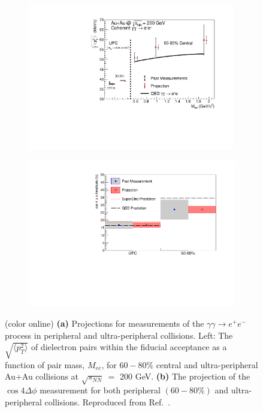 \documentclass[12pt,epjc3]{svjour3}\sloppy
\begin{document}
\begin{figure}
    \centering
    \begin{subfigure}{.50\textwidth}
      \centering
      \includegraphics[width=0.99\textwidth]{fig/bur_fig57_left.pdf}
      \caption{}
    \end{subfigure}%
    \begin{subfigure}{.50\textwidth}
      \centering
      \includegraphics[width=.99\linewidth]{fig/bur_fig57_right.pdf}
      \caption{}
    \end{subfigure}
    \caption{(color online) \textbf{(a)} Projections for measurements of the $\gamma\gamma\rightarrow e^+e^-$ process in peripheral and ultra-peripheral collisions. Left: The $\sqrt{\langle p_T^2 \rangle }$ of dielectron pairs within the fiducial acceptance as a function of pair mass, $M_{ee}$, for $60-80\%$ central and ultra-peripheral Au+Au collisions at $\sqrt{s_{NN}}\ =$ 200 GeV. \textbf{(b)} The projection of the $\cos{4\Delta\phi}$ measurement for both peripheral $(60-80\%)$ and ultra-peripheral collisions. Reproduced from Ref.~\cite{SN0755STARBeam}. }
    \label{fig:future2}
\end{figure}
\end{document}
